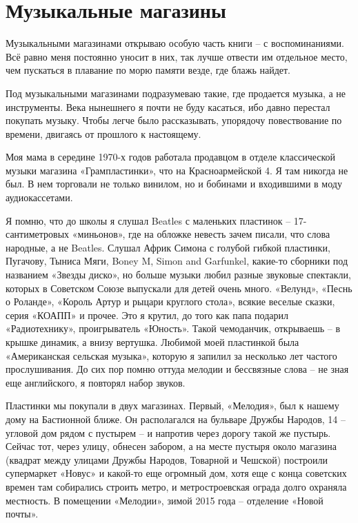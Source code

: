 \chapter{Музыкальные магазины}


Музыкальными магазинами открываю особую часть книги – с воспоминаниями. Всё равно меня постоянно уносит в них, так лучше отвести им отдельное место, чем пускаться в плавание по морю памяти везде, где блажь найдет.

Под музыкальными магазинами подразумеваю такие, где продается музыка, а не инструменты. Века нынешнего я почти не буду касаться, ибо давно перестал покупать музыку. Чтобы легче было рассказывать, упорядочу повествование по времени, двигаясь от прошлого к настоящему.

Моя мама в середине 1970-х годов работала продавцом в отделе классической музыки магазина «Грампластинки», что на Красноармейской 4. Я там никогда не был. В нем торговали не только винилом, но и бобинами и входившими в моду аудиокассетами. %

Я помню, что до школы я слушал Beatles с маленьких пластинок – 17-сантиметровых «миньонов», где на обложке невесть зачем писали, что слова народные, а не Beatles. Слушал Африк Симона с голубой гибкой пластинки, Пугачову, Тыниса Мяги, Boney M, Simon and Garfunkel, какие-то сборники под названием «Звезды диско», но больше музыки любил разные звуковые спектакли, которых в Советском Союзе выпускали для детей очень много. «Велунд», «Песнь о Роланде», «Король Артур и рыцари круглого стола», всякие веселые сказки, серия «КОАПП» и прочее. Это я крутил, до того как папа подарил «Радиотехнику», проигрыватель «Юность». Такой чемоданчик, открываешь – в крышке динамик, а внизу вертушка. Любимой моей пластинкой была «Американская сельская музыка», которую я запилил за несколько лет частого прослушивания. До сих пор помню оттуда мелодии и бессвязные слова – не зная еще английского, я повторял набор звуков.

Пластинки мы покупали в двух магазинах. Первый, «Мелодия», был к нашему дому на Бастионной ближе. Он располагался на бульваре Дружбы Народов, 14 – угловой дом рядом с пустырем – и напротив через дорогу такой же пустырь. Сейчас тот, через улицу, обнесен забором, а на месте пустыря около магазина (квадрат между улицами Дружбы Народов, Товарной и Чешской) построили супермаркет «Новус» и какой-то еще огромный дом, хотя еще с конца советских времен там собирались строить метро, и метростроевская ограда долго охраняла местность. В помещении «Мелодии», зимой 2015 года – отделение «Новой почты».

